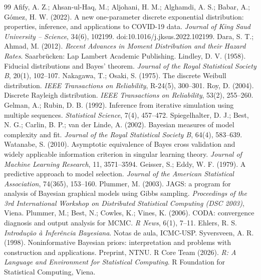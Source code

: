 \documentclass[11pt,a4paper]{article}
\begin{document}
\begin{thebibliography}{99}
 Afify, A. Z.; Ahsan-ul-Haq, M.; Aljohani, H. M.; Alghamdi, A. S.; Babar, A.; Gómez, H. W. (2022). A new one-parameter discrete exponential distribution: properties, inference, and applications to COVID-19 data. \emph{Journal of King Saud University -- Science}, 34(6), 102199. doi:10.1016/j.jksus.2022.102199.
 Dara, S. T.; Ahmad, M. (2012). \emph{Recent Advances in Moment Distribution and their Hazard Rates}. Saarbrücken: Lap Lambert Academic Publishing.
 Lindley, D. V. (1958). Fiducial distributions and Bayes' theorem. \emph{Journal of the Royal Statistical Society B}, 20(1), 102--107.
 Nakagawa, T.; Osaki, S. (1975). The discrete Weibull distribution. \emph{IEEE Transactions on Reliability}, R-24(5), 300--301.
 Roy, D. (2004). Discrete Rayleigh distribution. \emph{IEEE Transactions on Reliability}, 53(2), 255--260.
 Gelman, A.; Rubin, D. B. (1992). Inference from iterative simulation using multiple sequences. \emph{Statistical Science}, 7(4), 457--472.
 Spiegelhalter, D. J.; Best, N. G.; Carlin, B. P.; van der Linde, A. (2002). Bayesian measures of model complexity and fit. \emph{Journal of the Royal Statistical Society B}, 64(4), 583--639.
 Watanabe, S. (2010). Asymptotic equivalence of Bayes cross validation and widely applicable information criterion in singular learning theory. \emph{Journal of Machine Learning Research}, 11, 3571--3594.
 Geisser, S.; Eddy, W. F. (1979). A predictive approach to model selection. \emph{Journal of the American Statistical Association}, 74(365), 153--160.
 Plummer, M. (2003). JAGS: a program for analysis of Bayesian graphical models using Gibbs sampling. \emph{Proceedings of the 3rd International Workshop on Distributed Statistical Computing (DSC 2003)}, Viena.
 Plummer, M.; Best, N.; Cowles, K.; Vines, K. (2006). CODA: convergence diagnosis and output analysis for MCMC. \emph{R News}, 6(1), 7--11.
 Ehlers, R. S. \emph{Introdução à Inferência Bayesiana}. Notas de aula, ICMC-USP.
 Syversveen, A. R. (1998). Noninformative Bayesian priors: interpretation and problems with construction and applications. Preprint, NTNU.
 R Core Team (2026). \emph{R: A Language and Environment for Statistical Computing}. R Foundation for Statistical Computing, Viena.
\end{thebibliography}
\end{document}
